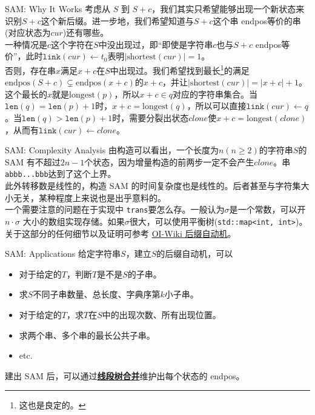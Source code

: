 \documentclass{beamer}
\theoremstyle{compact}
\def\obj#1{\textbf{\uline{#1}}}
\def\ge{\geqslant}
\def\endpos{\textrm{endpos}}
\def\link{\texttt{link}}
\def\len{\texttt{len}}
\def\tr{\texttt{trans}}
\begin{document}
\begin{frame}{SAM: Why It Works}
	考虑从 $S$ 到 $S+c$，我们其实只希望能够出现一个新状态来识别$S+c$这个新后缀。进一步地，我们希望知道与$S+c$这个串 \endpos 等价的串(对应状态为$cur$)还有哪些。\\

	一种情况是$c$这个字符在$S$中没出现过，即“即使是字符串$c$也与$S+c$ \endpos 等价”，此时$\link(cur) \gets t_0$表明$|\mathrm{shortest}(cur)| = 1$。\\

	否则，存在串$x$满足$x+c$在$S$中出现过。我们希望找到最长\footnote{\tiny 这也是良定的。}的满足$\endpos(S+c) \subsetneq \endpos(x+c)$的$x+c$，并让$|\mathrm{shortest}(cur)| = |x+c| + 1$。\\

	这个最长的$x$就是$\mathrm{longest}(p)$，所以$x+c \in q$对应的字符串集合。当$\len(q) = \len(p) + 1$时，$x + c = \mathrm{longest}(q)$，所以可以直接$\link(cur) \gets q$。当$\len(q) > \len(p) + 1$时，需要分裂出状态$clone$使$x + c = \mathrm{longest}(clone)$，从而有$\link(cur) \gets clone$。
\end{frame}
\begin{frame}{SAM: Complexity Analysis}
	由构造可以看出，一个长度为$n(n \ge 2)$的字符串$S$的 SAM 有不超过$2n-1$个状态，因为增量构造的前两步一定不会产生$clone$。串\texttt{abbb...bbb}达到了这个上界。\\

	此外转移数是线性的，构造 SAM 的时间复杂度也是线性的。后者甚至与字符集大小无关，某种程度上来说也是出乎意料的。\\

	一个需要注意的问题在于实现中 \tr 要怎么存。一般认为$\sigma$是一个常数，可以开$n \cdot \sigma$ 大小的数组实现存储。如果$\sigma$很大，可以使用平衡树(\texttt{std::map<int, int>})。\\
	
	关于这部分的任何细节以及证明可参考 \href{https://oi-wiki.org/string/sam/}{{OI-Wiki 后缀自动机}}。
\end{frame}
\begin{frame}{SAM: Applications}
	给定字符串$S$，建立$S$的后缀自动机，可以
	\begin{itemize}
		\item 对于给定的$T$，判断$T$是不是$S$的子串。
		\item 求$S$不同子串数量、总长度、字典序第$k$小子串。
		\item 对于给定的$T$，求$T$在$S$中的出现次数、所有出现位置。
		\item 求两个串、多个串的最长公共子串。
		\item etc.
	\end{itemize}

	建出 SAM 后，可以通过\obj{线段树合并}维护出每个状态的 \endpos。
\end{frame}
\end{document}
